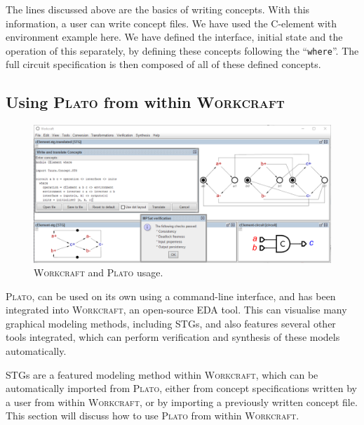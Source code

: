 \documentclass[british,conference,compsoc]{IEEEtran}
\newcommand{\noun}[1]{\textsc{#1}}
\begin{document}
The lines discussed above are the basics of writing concepts. With this 
information, a user can write concept files. We have used the 
C-element with environment example here. We have defined the interface, initial 
state and the operation of this separately, by defining these concepts following the 
``\texttt{where}''. The full circuit specification is then 
composed of all of these defined concepts. 

\subsection{Using \noun{Plato} from within \noun{Workcraft} \label{sec:workcraft_usage}}

\vspace{-3mm}

\begin{figure}[t]
\begin{centering}
\vspace{-3mm}
\includegraphics[scale=0.55]{Images/workcraft_design_flow.png}
\par\end{centering}
\begin{centering}
\protect\caption{\label{fig:design_flow_screenshot}\noun{Workcraft} and 
			\noun{Plato} usage.}
\par\end{centering}
\vspace{-3mm}
\end{figure}

\noun{Plato}, can be used on its own using a command-line interface, and has been
integrated into \noun{Workcraft}, an open-source EDA tool. This can visualise many graphical modeling
methods, including STGs, and also features several other tools integrated, which can perform verification
and synthesis of these models automatically.

STGs are a featured modeling method within \noun{Workcraft},
which can be automatically imported from \noun{Plato}, either from concept specifications written by a user from within 
\noun{Workcraft}, or by importing a previously written concept file. 
This section will discuss how to use \noun{Plato} from within
\noun{Workcraft}.
\end{document}
